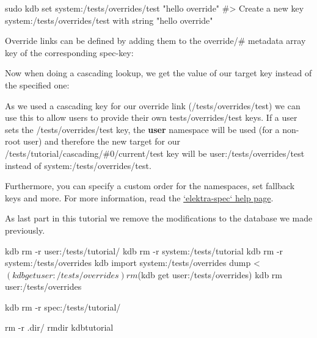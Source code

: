 \begin{DoxyCode}
sudo kdb set system:/tests/overrides/test "hello override"
#> Create a new key system:/tests/overrides/test with string "hello override"
\end{DoxyCode}


Override links can be defined by adding them to the {\ttfamily override/\#} metadata array key of the corresponding {\ttfamily spec-\/key}\+:




Now when doing a cascading lookup, we get the value of our target key instead of the specified one\+:




As we used a cascading key for our override link ({\ttfamily /tests/overrides/test}) we can use this to allow users to provide their own {\ttfamily tests/overrides/test} keys. If a user sets the {\ttfamily /tests/overrides/test} key, the {\bfseries user} namespace will be used (for a non-\/root user) and therefore the new target for our {\ttfamily /tests/tutorial/cascading/\#0/current/test} key will be {\ttfamily user\+:/tests/overrides/test} instead of {\ttfamily system\+:/tests/overrides/test}.




Furthermore, you can specify a custom order for the namespaces, set fallback keys and more. For more information, read the \hyperlink{doc_help_elektra-spec_md}{`elektra-\/spec` help page}.

As last part in this tutorial we remove the modifications to the database we made previously.


\begin{DoxyCode}
kdb rm -r user:/tests/tutorial/
kdb rm -r system:/tests/tutorial
kdb rm -r system:/tests/overrides
kdb import system:/tests/overrides dump < $(kdb get user:/tests/overrides)
rm $(kdb get user:/tests/overrides)
kdb rm user:/tests/overrides

kdb rm -r spec:/tests/tutorial/

rm -r .dir/
rmdir kdbtutorial
\end{DoxyCode}
 